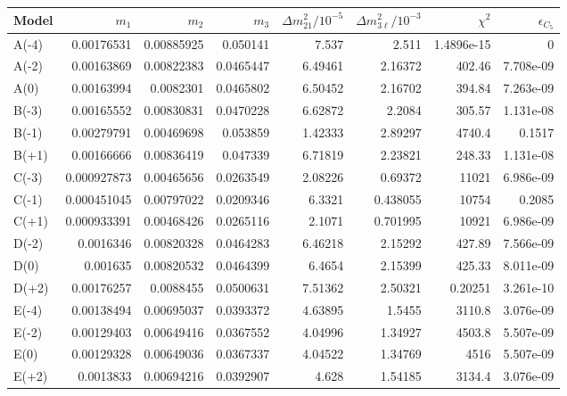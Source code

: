 \begin{tabular}{lrrrrrrr}
\hline
Model & $m_1$ & $m_2$ & $m_3$ & $\Delta m^2_{21}/10^{-5}$ & $\Delta m^2_{3\ell}/10^{-3}$ & $\chi^2$ & $\epsilon_{C_5}$ \\
\hline
A(-4) & 0.00176531 & 0.00885925 & 0.050141 & 7.537 & 2.511 & 1.4896e-15 & 0 \\
A(-2) & 0.00163869 & 0.00822383 & 0.0465447 & 6.49461 & 2.16372 & 402.46 & 7.708e-09 \\
A(0) & 0.00163994 & 0.0082301 & 0.0465802 & 6.50452 & 2.16702 & 394.84 & 7.263e-09 \\
B(-3) & 0.00165552 & 0.00830831 & 0.0470228 & 6.62872 & 2.2084 & 305.57 & 1.131e-08 \\
B(-1) & 0.00279791 & 0.00469698 & 0.053859 & 1.42333 & 2.89297 & 4740.4 & 0.1517 \\
B(+1) & 0.00166666 & 0.00836419 & 0.047339 & 6.71819 & 2.23821 & 248.33 & 1.131e-08 \\
C(-3) & 0.000927873 & 0.00465656 & 0.0263549 & 2.08226 & 0.69372 & 11021 & 6.986e-09 \\
C(-1) & 0.000451045 & 0.00797022 & 0.0209346 & 6.3321 & 0.438055 & 10754 & 0.2085 \\
C(+1) & 0.000933391 & 0.00468426 & 0.0265116 & 2.1071 & 0.701995 & 10921 & 6.986e-09 \\
D(-2) & 0.0016346 & 0.00820328 & 0.0464283 & 6.46218 & 2.15292 & 427.89 & 7.566e-09 \\
D(0) & 0.001635 & 0.00820532 & 0.0464399 & 6.4654 & 2.15399 & 425.33 & 8.011e-09 \\
D(+2) & 0.00176257 & 0.0088455 & 0.0500631 & 7.51362 & 2.50321 & 0.20251 & 3.261e-10 \\
E(-4) & 0.00138494 & 0.00695037 & 0.0393372 & 4.63895 & 1.5455 & 3110.8 & 3.076e-09 \\
E(-2) & 0.00129403 & 0.00649416 & 0.0367552 & 4.04996 & 1.34927 & 4503.8 & 5.507e-09 \\
E(0) & 0.00129328 & 0.00649036 & 0.0367337 & 4.04522 & 1.34769 & 4516 & 5.507e-09 \\
E(+2) & 0.0013833 & 0.00694216 & 0.0392907 & 4.628 & 1.54185 & 3134.4 & 3.076e-09 \\
\hline
\end{tabular}
